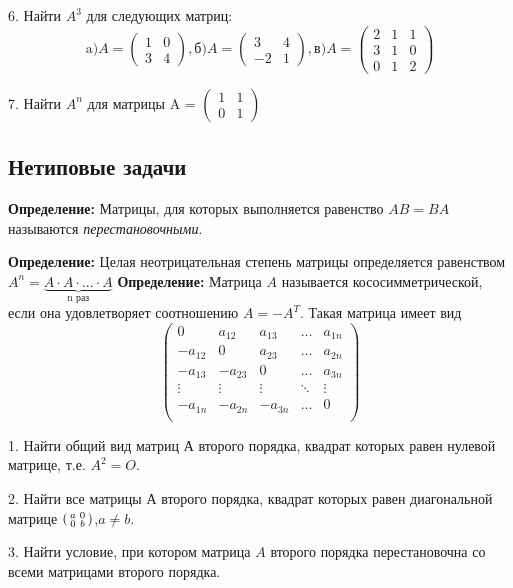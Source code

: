 \documentclass[12pt]{article}
\newenvironment{psmallmatrix}
  {\left(\begin{smallmatrix}}
  {\end{smallmatrix}\right)}
\begin{document}
6. Найти $A^3$ для следующих матриц:
\[
\text{a)}
A = \begin{pmatrix}
1 & 0\\
3 & 4
\end{pmatrix},
\text{б)}
A = \begin{pmatrix}
3 & 4\\
-2 & 1
\end{pmatrix},
\text{в)}
A = \begin{pmatrix}
2 & 1 & 1\\
3 & 1 & 0\\
0 & 1 & 2
\end{pmatrix}
\]

7. Найти $A^n$ для матрицы 
A = $\begin{pmatrix}
1 & 1\\
0 & 1
\end{pmatrix}$

\subsection*{Нетиповые задачи}	
\textbf{Определение:} Матрицы, для которых выполняется равенство $AB = BA$ называются {\it перестановочными}.

\textbf{Определение:} Целая неотрицательная степень матрицы определяется равенством $A^n = \underbrace{A \cdot A \cdot ... \cdot A}_\text{n раз}$
\textbf{Определение:} Матрица $A$ называется кососимметрической, если она удовлетворяет соотношению $A = -A^T$. Такая матрица имеет вид
\[
\begin{pmatrix}
0 & a_{12} & a_{13} & \dots & a_{1n}\\
-a_{12} & 0 & a_{23} &  \dots & a_{2n}\\
-a_{13} & -a_{23} & 0 &  \dots & a_{3n}\\
\vdots & \vdots & \vdots & \ddots & \vdots\\ 
-a_{1n} & -a_{2n} & -a_{3n} & \dots & 0\\
\end{pmatrix}
\]

1. Найти общий вид матриц А второго порядка, квадрат которых равен нулевой матрице, т.е. $A^2 = O$.

2. Найти все матрицы А второго порядка, квадрат которых равен диагональной матрице 
$\begin{psmallmatrix}a & 0\\0 & b\end{psmallmatrix}$,$a \neq b$.

3. Найти условие, при котором матрица $A$ второго порядка перестановочна со всеми матрицами второго порядка.
\end{document}
